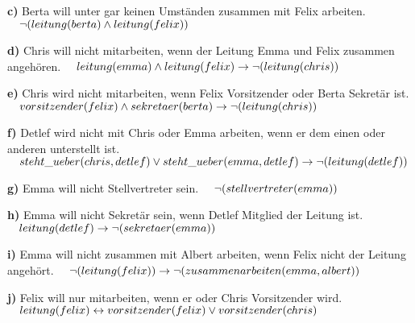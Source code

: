 \documentclass{article}
\newcommand{\linespace}{\phantom{} \vspace{10pt}}
\newcommand{\eqspa}{\phantom{} \hspace{10pt}}
\begin{document}
\begin{flushleft}
\linespace
\textbf{c) } Berta will unter gar keinen Umständen zusammen mit Felix arbeiten.
$
\newline
\eqspa \neg(leitung(berta) \land leitung(felix)) \newline
$



\linespace
\textbf{d) } Chris will nicht mitarbeiten, wenn der Leitung Emma und Felix zusammen angehören.
$
\newline
\eqspa leitung(emma) \land leitung(felix) \to \neg(leitung(chris)) \newline
$



\linespace
\textbf{e) } Chris wird nicht mitarbeiten, wenn Felix Vorsitzender oder Berta Sekretär ist.
$
\newline
\eqspa vorsitzender(felix) \land sekretaer(berta) \to \neg(leitung(chris)) \newline
$



\linespace
\textbf{f) } Detlef wird nicht mit Chris oder Emma arbeiten, wenn er dem einen oder anderen unterstellt ist.
$
\newline
\eqspa steht\_ueber(chris, detlef) \lor steht\_ueber(emma, detlef) \to \neg(leitung(detlef)) \newline
$



\linespace
\textbf{g) }  Emma will nicht Stellvertreter sein.
$
\newline
\eqspa \neg(stellvertreter(emma)) \newline
$



\linespace
\textbf{h) } Emma will nicht Sekretär sein, wenn Detlef Mitglied der Leitung ist.
$
\newline
\eqspa leitung(detlef) \to \neg(sekretaer(emma)) \newline
$



\linespace
\textbf{i) } Emma will nicht zusammen mit Albert arbeiten, wenn Felix nicht der Leitung angehört.
$
\newline
\eqspa \neg(leitung(felix)) \to \neg(zusammenarbeiten(emma, albert)) \newline
$



\linespace
\textbf{j) } Felix will nur mitarbeiten, wenn er oder Chris Vorsitzender wird.
$
\newline
\eqspa leitung(felix) \leftrightarrow vorsitzender(felix) \lor vorsitzender(chris)
$

\end{flushleft}
\end{document}
